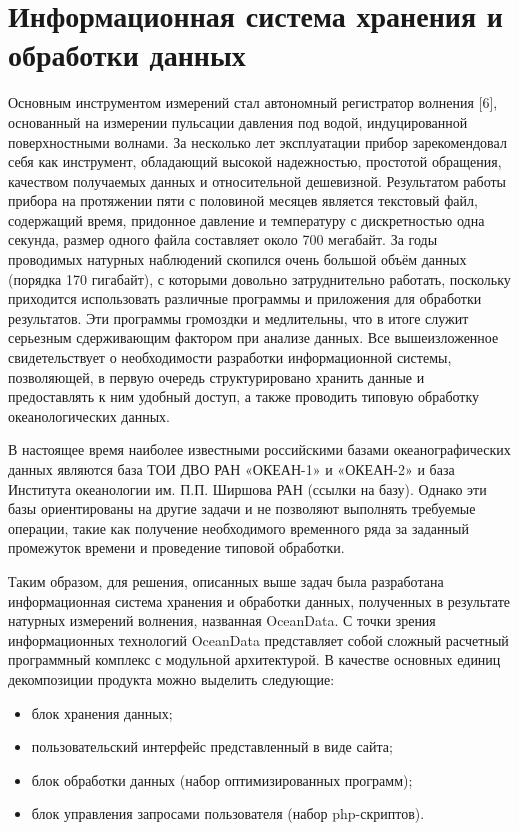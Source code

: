 \section{Информационная система хранения и обработки данных}\label{informSystem}

Основным инструментом измерений стал автономный регистратор волнения [6], основанный на измерении пульсации давления под водой, индуцированной поверхностными волнами. За несколько лет эксплуатации прибор зарекомендовал себя как инструмент, обладающий высокой надежностью, простотой обращения, качеством получаемых данных и относительной дешевизной. Результатом работы прибора на протяжении пяти с половиной месяцев является текстовый файл, содержащий время, придонное давление и температуру с дискретностью одна секунда, размер одного файла составляет около 700 мегабайт. За годы проводимых натурных наблюдений скопился очень большой объём данных (порядка 170 гигабайт), с которыми довольно затруднительно работать, поскольку приходится использовать различные программы и приложения для обработки результатов. Эти программы громоздки и медлительны, что в итоге служит серьезным сдерживающим фактором при анализе данных. Все вышеизложенное свидетельствует о необходимости разработки информационной системы, позволяющей, в первую очередь структурировано хранить данные и предоставлять к ним удобный доступ, а также проводить типовую обработку океанологических данных.

В настоящее время наиболее известными российскими базами океанографических данных являются база ТОИ ДВО РАН «ОКЕАН-1» и «ОКЕАН-2»  и база Института океанологии им. П.П. Ширшова РАН \textcolor[rgb]{1.00,0.00,0.00}{(ссылки на базу)}. Однако эти базы ориентированы на другие задачи и не позволяют выполнять требуемые операции, такие как получение необходимого временного ряда за заданный промежуток времени и проведение типовой обработки.

Таким образом, для решения, описанных выше задач была разработана информационная система хранения и обработки данных, полученных в результате натурных измерений волнения, названная OceanData. С точки зрения информационных технологий OceanData представляет собой сложный расчетный программный комплекс с модульной архитектурой. В качестве основных единиц декомпозиции продукта можно выделить следующие:
\begin{itemize}
  \item блок хранения данных;
  \item пользовательский интерфейс представленный в виде сайта;
  \item блок обработки данных (набор оптимизированных программ);
  \item блок управления запросами пользователя (набор php-скриптов).
\end{itemize}

